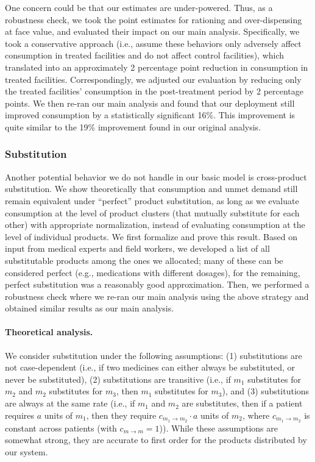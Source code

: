 \documentclass[12pt]{article}
\begin{document}
One concern could be that our estimates are under-powered. Thus, as a robustness check, we took the point estimates for rationing and over-dispensing at face value, and evaluated their impact on our main analysis. Specifically, we took a conservative approach (i.e., assume these behaviors only adversely affect consumption in treated facilities and do not affect control facilities), which translated into an approximately 2 percentage point reduction in consumption in treated facilities. Correspondingly, we adjusted our evaluation by reducing only the treated facilities’ consumption in the post-treatment period by 2 percentage points. We then re-ran our main analysis and found that our deployment still improved consumption by a statistically significant 16\%. This improvement is quite similar to the 19\% improvement found in our original analysis.

\subsubsection{Substitution}
\label{sup:substitution}

Another potential behavior we do not handle in our basic model is cross-product substitution. We show theoretically that consumption and unmet demand still remain equivalent under ``perfect'' product substitution, as long as we evaluate consumption at the level of product clusters (that mutually substitute for each other) with appropriate normalization, instead of evaluating consumption at the level of individual products. We first formalize and prove this result. Based on input from medical experts and field workers, we developed a list of all substitutable products among the ones we allocated; many of these can be considered perfect (e.g., medications with different dosages), for the remaining, perfect substitution was a reasonably good approximation. Then, we performed a robustness check where we re-ran our main analysis using the above strategy and obtained similar results as our main analysis.

\paragraph{Theoretical analysis.}

We consider substitution under the following assumptions: (1) substitutions are not case-dependent (i.e., if two medicines can either always be substituted, or never be substituted), (2) substitutions are transitive (i.e., if $m_1$ substitutes for $m_2$ and $m_2$ substitutes for $m_3$, then $m_1$ substitutes for $m_3$), and (3) substitutions are always at the same rate (i.e., if $m_1$ and $m_2$ are substitutes, then if a patient requires $a$ units of $m_1$, then they require $c_{m_1\to m_2}\cdot a$ units of $m_2$, where $c_{m_1\to m_2}$ is constant across patients (with $c_{m\to m}=1$)). While these assumptions are somewhat strong, they are accurate to first order for the products distributed by our system.
\end{document}
